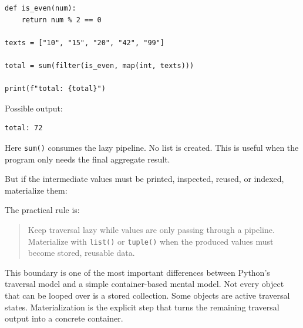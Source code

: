 \begin{verbatim}
def is_even(num):
    return num % 2 == 0

texts = ["10", "15", "20", "42", "99"]

total = sum(filter(is_even, map(int, texts)))

print(f"total: {total}")
\end{verbatim}

Possible output:

\begin{verbatim}
total: 72
\end{verbatim}

Here \texttt{sum()} consumes the lazy pipeline. No list is created. This is useful when the program only needs the final aggregate result.

But if the intermediate values must be printed, inspected, reused, or indexed, materialize them:



The practical rule is:

\begin{quote}
Keep traversal lazy while values are only passing through a pipeline. Materialize with \texttt{list()} or \texttt{tuple()} when the produced values must become stored, reusable data.
\end{quote}

This boundary is one of the most important differences between Python's traversal model and a simple container-based mental model. Not every object that can be looped over is a stored collection. Some objects are active traversal states. Materialization is the explicit step that turns the remaining traversal output into a concrete container.